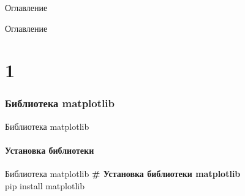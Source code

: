 \documentclass[12pt]{beamer}
\begin{document}
\begin{frame}[t]{Оглавление}
\tableofcontents[part=1]
\end{frame}

\begin{frame}{Оглавление}
\tableofcontents[part=2]
\end{frame}



\part{1}

\section{Библиотека matplotlib}
\begin{frame}{Библиотека matplotlib}
 \\
\vspace{0.3cm}
\href{https://matplotlib.org/}{}
\end{frame}

\subsection{Установка библиотеки}
\begin{frame}{Библиотека matplotlib}
\textbf{\# Установка библиотеки matplotlib} \\
\vspace{0.5cm}
pip install matplotlib
\end{frame}
\end{document}
